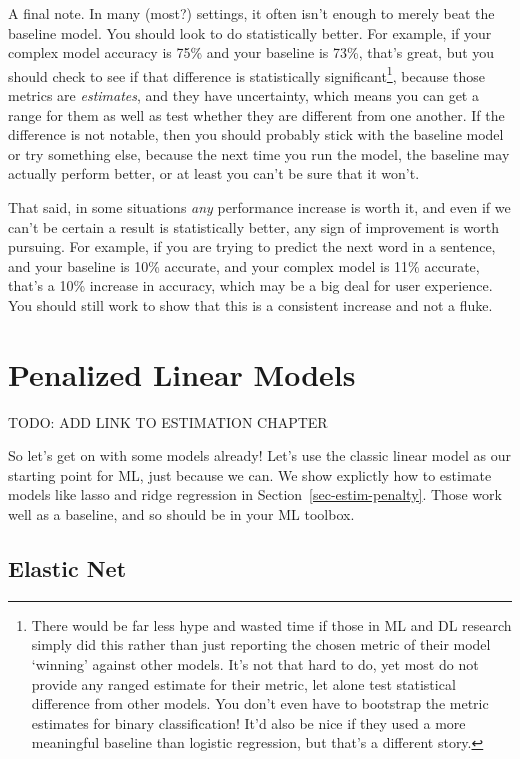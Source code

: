 \documentclass[
  letterpaper,
]{krantz}
\begin{document}
A final note. In many (most?) settings, it often isn't enough to merely
beat the baseline model. You should look to do statistically better. For
example, if your complex model accuracy is 75\% and your baseline is
73\%, that's great, but you should check to see if that difference is
statistically significant\footnote{There would be far less hype and
  wasted time if those in ML and DL research simply did this rather than
  just reporting the chosen metric of their model `winning' against
  other models. It's not that hard to do, yet most do not provide any
  ranged estimate for their metric, let alone test statistical
  difference from other models. You don't even have to bootstrap the
  metric estimates for binary classification! It'd also be nice if they
  used a more meaningful baseline than logistic regression, but that's a
  different story.}, because those metrics are \emph{estimates}, and
they have uncertainty, which means you can get a range for them as well
as test whether they are different from one another. If the difference
is not notable, then you should probably stick with the baseline model
or try something else, because the next time you run the model, the
baseline may actually perform better, or at least you can't be sure that
it won't.

That said, in some situations \emph{any} performance increase is worth
it, and even if we can't be certain a result is statistically better,
any sign of improvement is worth pursuing. For example, if you are
trying to predict the next word in a sentence, and your baseline is 10\%
accurate, and your complex model is 11\% accurate, that's a 10\%
increase in accuracy, which may be a big deal for user experience. You
should still work to show that this is a consistent increase and not a
fluke.

\section{Penalized Linear Models}\label{sec-ml-penalized}

TODO: ADD LINK TO ESTIMATION CHAPTER

So let's get on with some models already! Let's use the classic linear
model as our starting point for ML, just because we can. We show
explictly how to estimate models like lasso and ridge regression in
Section~\ref{sec-estim-penalty}. Those work well as a baseline, and so
should be in your ML toolbox.

\subsection{Elastic Net}\label{elastic-net}
\end{document}
